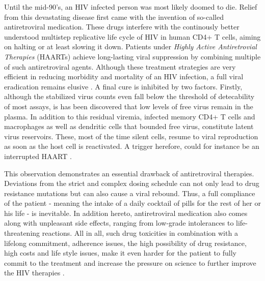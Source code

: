 Until the mid-90's, an HIV infected person was most likely doomed to die.
Relief from this devastating disease first came with the invention of so-called antiretroviral medication.
These drugs interfere with the continously better understood multistep replicative life cycle of HIV in 
human CD4+ T cells, aiming on halting or at least slowing it down.
Patients under \textit{Highly Active Antiretrovial Therapies} (HAARTs) achieve long-lasting viral suppression by 
combining multiple of such antiretroviral agents.
Although these treatment strategies are very efficient in reducing morbidity and mortality of an HIV infection, a
full viral eradication remains elusive \cite{pau2014antiretroviral,simon2006hiv}.
A final cure is inhibited by two factors.
Firstly, although the stabilized virus counts even fall below the threshold of detecability of most assays, 
is has been discovered that low levels of free virus remain in the plasma.
In addition to this residual viremia, infected memory CD4+ T cells and macrophages as well as dendritic cells that bounded 
free virus, constitute latent virus reservoirs.
These, most of the time silent cells, resume to viral reproduction as soon as the host cell is reactivated.
A trigger herefore, could for instance be an interrupted HAART \cite{ruelas2013integrated,shen2008viral}.\par

This observation demonstrates an essential drawback of antiretroviral therapies. Deviations from the strict and 
complex dosing schedule can not only lead to drug resistance mutations but can also cause a viral rebound.
Thus, a full compliance of the patient - meaning the intake of a daily cocktail of pills for the rest of her or his life - is inevitable.
In addition hereto, antiretroviral medication also comes along with unpleasant side effects, ranging from low-grade intolerances to 
life-threatening reactions.
All in all, such drug toxicities in combination with a lifelong commitment, adherence issues, the high possibility of drug resistance, 
high costs and life style issues, make it even harder for the patient to fully commit to the treatment and increase the pressure on science
to further improve the HIV therapies \cite{lu2018haart,pau2014antiretroviral}.\par

